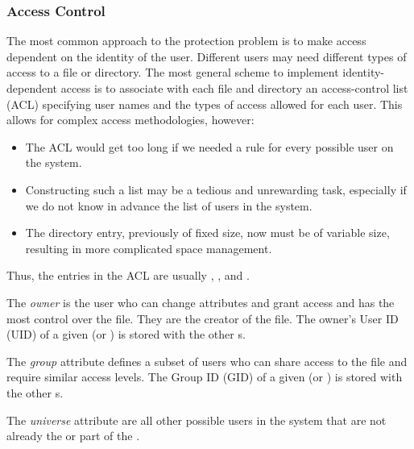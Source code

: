 \subsubsection{Access Control}\label{subsubsec:Access_Control}
The most common approach to the protection problem is to make access dependent on the identity of the user.
Different users may need different types of access to a file or directory.
The most general scheme to implement identity-dependent access is to associate with each file and directory an access-control list (ACL) specifying user names and the types of access allowed for each user.
This allows for complex access methodologies, however:
\begin{itemize}[noitemsep]
\item The ACL would get too long if we needed a rule for every possible user on the system.
\item Constructing such a list may be a tedious and unrewarding task, especially if we do not know in advance the list of users in the system.
\item The directory entry, previously of fixed size, now must be of variable size, resulting in more complicated space management.
\end{itemize}

Thus, the entries in the ACL are usually , , and .
\begin{definition}[Owner]\label{def:File_Owner}
  The \emph{owner} is the user who can change attributes and grant access and has the most control over the file.
  They are the creator of the file.
  The owner's User ID (UID) of a given  (or ) is stored with the other s.
\end{definition}

\begin{definition}[Group]\label{def:File_Group}
  The \emph{group} attribute defines a subset of users who can share access to the file and require similar access levels.
  The Group ID (GID) of a given  (or ) is stored with the other s.
\end{definition}

\begin{definition}[Universe]\label{def:File_Universe}
  The \emph{universe} attribute are all other possible users in the system that are not already the  or part of the .
\end{definition}


